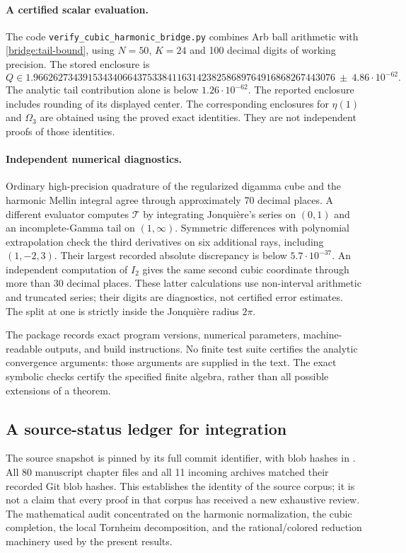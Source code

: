 \documentclass[11pt]{article}
\numberwithin{equation}{section}
\theoremstyle{definition}
\theoremstyle{remark}
\newcommand{\T}{\mathcal T}
\begin{document}
\paragraph{A certified scalar evaluation.}
The code \texttt{verify\_cubic\_harmonic\_bridge.py} combines
Arb ball arithmetic with \eqref{bridge:tail-bound}, using
$N=50$, $K=24$ and 100 decimal digits of working precision.
The stored enclosure is
\[
 Q\in 1.9662627343915343406643753384116314238258689764916868267443076
       \ \pm\ 4.86\cdot10^{-62}.
\]
The analytic tail contribution alone is below $1.26\cdot10^{-62}$.
The reported enclosure includes rounding of its displayed center.
The corresponding enclosures for $\eta(1)$ and $\Omega_3$ are
obtained using the proved exact identities. They are not independent
proofs of those identities.

\paragraph{Independent numerical diagnostics.}
Ordinary high-precision quadrature of the regularized digamma cube
and the harmonic Mellin integral agree through approximately 70
decimal places. A different evaluator computes $\T$ by integrating
Jonqui\`ere's series on $(0,1)$ and an incomplete-Gamma tail on
$(1,\infty)$. Symmetric differences with polynomial extrapolation
check the third derivatives on six additional rays, including
$(1,-2,3)$. Their largest recorded absolute discrepancy is below
$5.7\cdot10^{-37}$. An independent computation of $I_2$ gives the
same second cubic coordinate through more than 30 decimal places.
These latter calculations use non-interval arithmetic and truncated
series; their digits are diagnostics, not certified error estimates.
The split at one is strictly inside the Jonqui\`ere radius $2\pi$.

The package records exact program versions, numerical parameters,
machine-readable outputs, and build instructions. No finite test
suite certifies the analytic convergence arguments: those arguments
are supplied in the text. The exact symbolic checks certify the
specified finite algebra, rather than all possible extensions of a
theorem.

\subsection{A source-status ledger for integration}

The source snapshot is pinned by its full commit identifier, with
blob hashes in .
All 80 manuscript chapter files and all 11 incoming archives matched
their recorded Git blob hashes. This establishes the identity of the
source corpus; it is not a claim that every proof in that corpus has
received a new exhaustive review. The mathematical audit concentrated
on the harmonic normalization, the cubic completion, the local
Tornheim decomposition, and the rational/colored reduction machinery
used by the present results.
\end{document}

